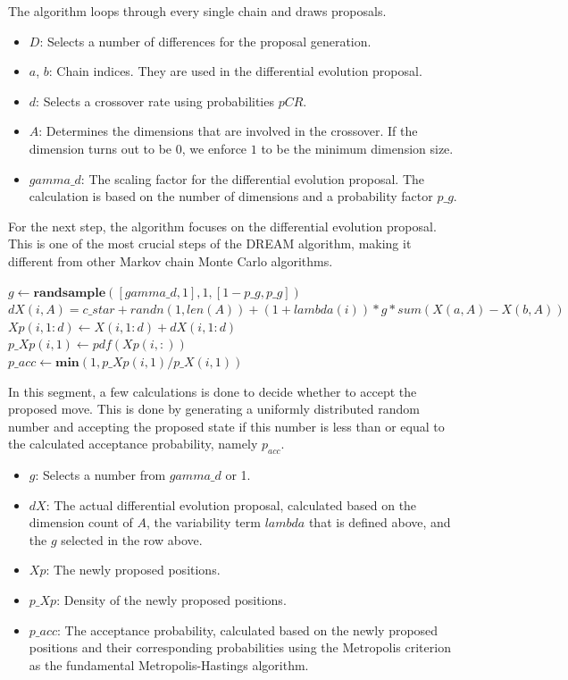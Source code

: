 The algorithm loops through every single chain and draws proposals.
\begin{itemize}
    \item $D$: Selects a number of differences for the proposal generation.
    \item $a$, $b$: Chain indices. They are used in the differential evolution proposal.
    \item $d$: Selects a crossover rate using probabilities $pCR$.
    \item $A$: Determines the dimensions that are involved in the crossover. If the dimension turns out to be $0$, we enforce $1$ to be the minimum dimension size.
    \item $gamma\_d$: The scaling factor for the differential evolution proposal. The calculation is based on the number of dimensions and a probability factor $p\_g$.
\end{itemize}

For the next step, the algorithm focuses on the differential evolution proposal. This is one of the most crucial steps of the DREAM algorithm, making it different from other Markov chain Monte Carlo algorithms.

\begin{algorithm}[H]
$g \gets \textbf{randsample}([gamma\_d, 1], 1, [1-p\_g, p\_g])$\\
$dX(i, A) = c\_star + randn(1, len(A)) + (1 + lambda(i)) * g * sum(X(a, A) - X(b, A))$\\
$Xp(i, 1:d) \gets X(i, 1:d) + dX(i, 1:d)$\\
$p\_Xp(i, 1) \gets pdf(Xp(i, :))$\\
$p\_acc \gets \textbf{min}(1, p\_Xp(i, 1) / p\_X(i, 1))$
\end{algorithm}

In this segment, a few calculations is done to decide whether to accept the proposed move. This is done by generating a uniformly distributed random number and accepting the proposed state if this number is less than or equal to the calculated acceptance probability, namely $p_{acc}$.

\begin{itemize}
    \item $g$: Selects a number from $gamma\_d$ or 1.
    \item $dX$: The actual differential evolution proposal, calculated based on the dimension count of $A$, the variability term $lambda$ that is defined above, and the $g$ selected in the row above.
    \item $Xp$: The newly proposed positions.
    \item $p\_Xp$: Density of the newly proposed positions.
    \item $p\_acc$: The acceptance probability, calculated based on the newly proposed positions and their corresponding probabilities using the Metropolis criterion as the fundamental Metropolis-Hastings algorithm.
\end{itemize}

